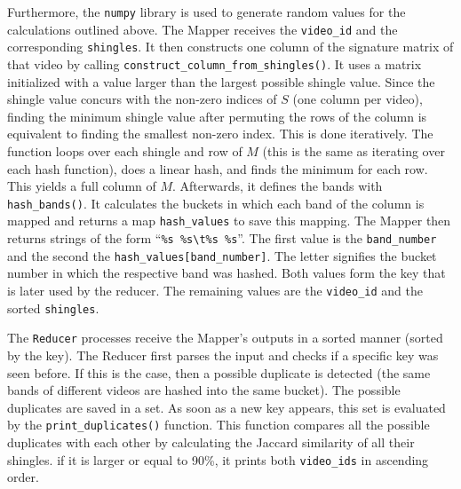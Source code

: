 \documentclass[a4paper, 11pt]{article}
\begin{document}
Furthermore, the \texttt{numpy} library is used to generate random values for the calculations outlined above. The Mapper receives the \texttt{video\_id} and the corresponding  \texttt{shingles}. It then constructs one column of the signature matrix of that video by calling \texttt{construct\_column\_from\_shingles()}. It uses a matrix initialized with a value larger than the largest possible shingle value. Since the shingle value concurs with the non-zero indices of $S$ (one column per video), finding the minimum shingle value after permuting the rows of the column is equivalent to finding the smallest non-zero index. This is done iteratively. The function loops over each shingle and row of $M$ (this is the same as iterating over each hash function), does a linear hash, and finds the minimum for each row. This yields a full column of $M$. \newline 
Afterwards, it defines the bands with \texttt{hash\_bands()}. It calculates the buckets in which each band of the column is mapped and returns a map \texttt{hash\_values} to save this mapping. The Mapper then returns  strings of the form ``\texttt{\%s \%s\textbackslash t\%s \%s}''. The first value is the \texttt{band\_number} and the second the \texttt{hash\_values[band\_number]}. The letter signifies the bucket number in which the respective band was hashed. Both values form the key that is later used by the reducer. The remaining values are the \texttt{video\_id} and the sorted \texttt{shingles}.

The \texttt{Reducer} processes receive the Mapper's outputs in a sorted manner (sorted by the key).  The Reducer first parses the input and checks if a specific key was seen before. If this is the case, then a possible duplicate is detected (the same bands of different videos are hashed into the same bucket). The possible duplicates are saved in a set. As soon as a new key appears, this set is evaluated by the \texttt{print\_duplicates()} function. This function compares all the possible duplicates with each other by calculating the Jaccard similarity of all their shingles. if it is larger or equal to 90\%, it prints both \texttt{video\_ids} in ascending order.
\end{document}
